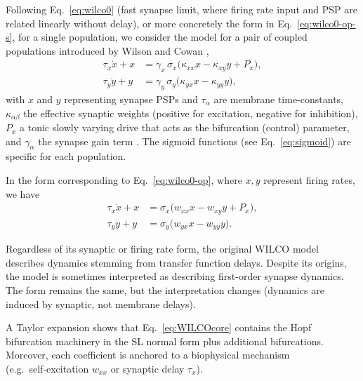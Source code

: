 \documentclass[11pt]{article}
\numberwithin{equation}{section}
\begin{document}
Following Eq.~\eqref{eq:wilco0} (fast synapse limit, where firing rate input and PSP are related linearly without delay), or more concretely the  form in Eq.~\eqref{eq:wilco0-op-s},  for a single population, we consider the  model for a pair of coupled populations introduced by Wilson and Cowan \cite{wilson_excitatory_1972},
\begin{equation}
    \begin{aligned}
  \tau_x \dot{x}+x &= \gamma_x\,\sigma_x\!\bigl(\kappa_{xx}x - \kappa_{xy}y + P_x\bigr),\\
  \tau_y \dot{y}+y &= \gamma_y\,\sigma_y\!\bigl(\kappa_{yx}x - \kappa_{yy}y\bigr),
  \label{eq:WILCOcore-psp}
\end{aligned}
\end{equation}
 with $x$ and $y$ representing synapse PSPs   and \(\tau_{\alpha}\) are membrane time‑constants, \(\kappa_{\alpha\beta}\) the effective synaptic weights (positive for excitation, negative for inhibition), \(P_x\) a tonic slowly varying drive that acts as the bifurcation (control) parameter, and \(\gamma_{\alpha}\) the synapse gain term 
\cite{Ermentrout2010}.  The sigmoid functions (see Eq.~\ref{eq:sigmoid}) are specific for each population.  

In the form  corresponding to Eq.~\eqref{eq:wilco0-op}, where $x,y$ represent firing rates, we have
\begin{equation}
\begin{aligned}
  \tau_x \dot{x}+x &=  \sigma_x\!\bigl(w_{xx}x - w_{xy}y + P_x\bigr),\\
  \tau_y \dot{y}+y &=  \sigma_y\!\bigl(w_{yx}x - w_{yy}y\bigr).
  \label{eq:WILCOcore}
\end{aligned}
\end{equation}


 
Regardless of its synaptic or firing rate form, the original WILCO model describes dynamics stemming from transfer function delays. 
Despite its origins, the model is sometimes interpreted as describing first-order synapse dynamics. The form remains the same, but the interpretation changes (dynamics are induced by synaptic, not membrane delays). 

A Taylor expansion shows that Eq.~\eqref{eq:WILCOcore} contains the  Hopf bifurcation machinery in the SL normal form plus additional bifurcations. Moreover,  each coefficient is anchored to a biophysical mechanism (e.g.\ self‑excitation \(w_{xx}\) or synaptic delay \(\tau_x\)).
\end{document}
